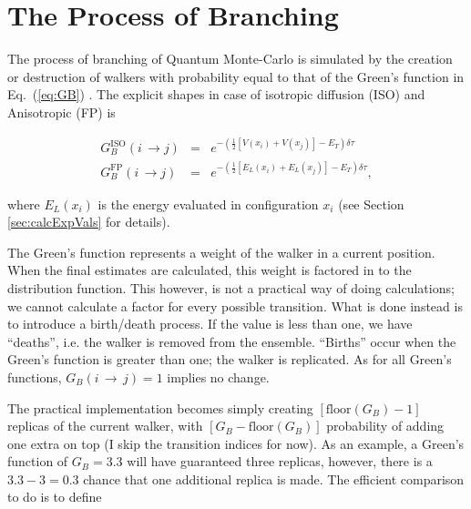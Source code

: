 \section{The Process of Branching}
\label{sec:branching}

The process of branching of Quantum Monte-Carlo is simulated by the creation or destruction of walkers with probability equal to that of the Green's function in Eq.~(\ref{eq:GB}) \cite{abInitioMC}. The explicit shapes in case of isotropic diffusion (ISO) and Anisotropic (FP) is

\begin{eqnarray}
 G_B^\mathrm{ISO}(i\,\rightarrow j) &=& e^{-\left(\frac{1}{2}\left[V(x_i) + V(x_j)\right] - E_T\right)\delta\tau}\label{eq:branchISO} \\
 G_B^\mathrm{FP}(i\,\rightarrow j) &=& e^{-\left(\frac{1}{2}\left[E_L(x_i) + E_L(x_j)\right] - E_T\right)\delta\tau}, \label{eq:branchFP}
\end{eqnarray}

where $E_L(x_i)$ is the energy evaluated in configuration $x_i$ (see Section \ref{sec:calcExpVals} for details). 

The Green's function represents a weight of the walker in a current position. When the final estimates are calculated, this weight is factored in to the distribution function. This however, is not a practical way of doing calculations; we cannot calculate a factor for every possible transition. What is done instead is to introduce a birth/death process. If the value is less than one, we have ``deaths'', i.e. the walker is removed from the ensemble. ``Births'' occur when the Green's function is greater than one; the walker is replicated. As for all Green's functions, $G_B(i\,\rightarrow\,j) = 1$ implies no change. 

The practical implementation becomes simply creating $\left[\mathrm{floor}(G_B) - 1\right]$ replicas of the current walker, with $\left[G_B - \mathrm{floor}(G_B)\right]$ probability of adding one extra on top (I skip the transition indices for now). As an example, a Green's function of $G_B=3.3$ will have guaranteed three replicas, however, there is a $3.3-3 = 0.3$ chance that one additional replica is made. The efficient comparison to do is to define 




